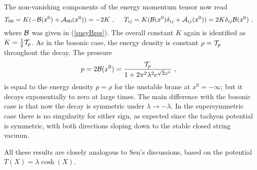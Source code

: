\documentclass[a4paper,12pt]{article}
\begin{document}
The non-vanishing components of the energy momentum tensor now read 
\begin{equation}
T_{00} = K(-{\cal B}(x^0) + {\cal A}_{00}(x^0)) = -2K~,~~~~
T_{ij} = K({\cal B}(x^0)\delta_{ij} + {\cal A}_{ij}(x^0)) = 2K\delta_{ij}{\cal B}(x^0)~,
\end{equation}
where ${\cal B}$ was given in (\ref{susyBres}). The overall constant $K$ again
is identified as $K={1\over 2}{\cal T}_p$. As in the bosonic case, the energy density is constant
$\rho={\cal T}_p$ throughout the decay. The pressure
\begin{equation}
p=2{\cal B}(x^0) = {{\cal T}_p\over 1+ 2\pi^2\lambda^2 e^{\sqrt{2}x^0}}~,
\end{equation}
is equal to the energy density $p=\rho$ for the unstable brane at $x^0=-\infty$; but
it decays exponentially to zero at large times. The main difference with the bosonic case 
is that now the decay is symmetric under $\lambda\to -\lambda$. In the supersymmetric
case there is no singularity for either sign, as expected since the tachyon potential 
is symmetric, with both directions sloping down to the stable closed string vacuum.

All these results are closely analogous to Sen's discussions, based on the potential 
$T(X)=\lambda\cosh(X)$.
\end{document}
